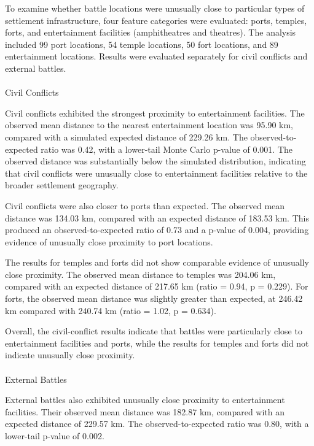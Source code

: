 \documentclass[
  letterpaper,
  DIV=11,
  numbers=noendperiod]{scrartcl}
\makeatletter
\let\oldparagraph\paragraph
\renewcommand{\paragraph}{
    \@ifstar
      \xxxParagraphStar
      \xxxParagraphNoStar
  }
\newcommand{\xxxParagraphStar}[1]{\oldparagraph*{#1}\mbox{}}
\newcommand{\xxxParagraphNoStar}[1]{\oldparagraph{#1}\mbox{}}
\makeatother
\begin{document}
To examine whether battle locations were unusually close to particular
types of settlement infrastructure, four feature categories were
evaluated: ports, temples, forts, and entertainment facilities
(amphitheatres and theatres). The analysis included 99 port locations,
54 temple locations, 50 fort locations, and 89 entertainment locations.
Results were evaluated separately for civil conflicts and external
battles.

\paragraph{Civil Conflicts}\label{civil-conflicts}

Civil conflicts exhibited the strongest proximity to entertainment
facilities. The observed mean distance to the nearest entertainment
location was 95.90 km, compared with a simulated expected distance of
229.26 km. The observed-to-expected ratio was 0.42, with a lower-tail
Monte Carlo p-value of 0.001. The observed distance was substantially
below the simulated distribution, indicating that civil conflicts were
unusually close to entertainment facilities relative to the broader
settlement geography.

Civil conflicts were also closer to ports than expected. The observed
mean distance was 134.03 km, compared with an expected distance of
183.53 km. This produced an observed-to-expected ratio of 0.73 and a
p-value of 0.004, providing evidence of unusually close proximity to
port locations.

The results for temples and forts did not show comparable evidence of
unusually close proximity. The observed mean distance to temples was
204.06 km, compared with an expected distance of 217.65 km (ratio =
0.94, p = 0.229). For forts, the observed mean distance was slightly
greater than expected, at 246.42 km compared with 240.74 km (ratio =
1.02, p = 0.634).

Overall, the civil-conflict results indicate that battles were
particularly close to entertainment facilities and ports, while the
results for temples and forts did not indicate unusually close
proximity.

\paragraph{External Battles}\label{external-battles}

External battles also exhibited unusually close proximity to
entertainment facilities. Their observed mean distance was 182.87 km,
compared with an expected distance of 229.57 km. The
observed-to-expected ratio was 0.80, with a lower-tail p-value of 0.002.
\end{document}
